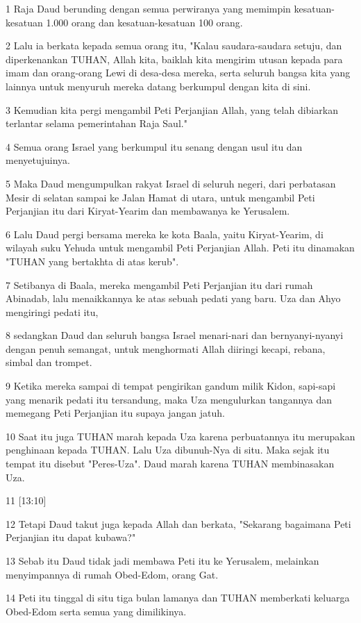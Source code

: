 \par 1 Raja Daud berunding dengan semua perwiranya yang memimpin kesatuan-kesatuan 1.000 orang dan kesatuan-kesatuan 100 orang.
\par 2 Lalu ia berkata kepada semua orang itu, "Kalau saudara-saudara setuju, dan diperkenankan TUHAN, Allah kita, baiklah kita mengirim utusan kepada para imam dan orang-orang Lewi di desa-desa mereka, serta seluruh bangsa kita yang lainnya untuk menyuruh mereka datang berkumpul dengan kita di sini.
\par 3 Kemudian kita pergi mengambil Peti Perjanjian Allah, yang telah dibiarkan terlantar selama pemerintahan Raja Saul."
\par 4 Semua orang Israel yang berkumpul itu senang dengan usul itu dan menyetujuinya.
\par 5 Maka Daud mengumpulkan rakyat Israel di seluruh negeri, dari perbatasan Mesir di selatan sampai ke Jalan Hamat di utara, untuk mengambil Peti Perjanjian itu dari Kiryat-Yearim dan membawanya ke Yerusalem.
\par 6 Lalu Daud pergi bersama mereka ke kota Baala, yaitu Kiryat-Yearim, di wilayah suku Yehuda untuk mengambil Peti Perjanjian Allah. Peti itu dinamakan "TUHAN yang bertakhta di atas kerub".
\par 7 Setibanya di Baala, mereka mengambil Peti Perjanjian itu dari rumah Abinadab, lalu menaikkannya ke atas sebuah pedati yang baru. Uza dan Ahyo mengiringi pedati itu,
\par 8 sedangkan Daud dan seluruh bangsa Israel menari-nari dan bernyanyi-nyanyi dengan penuh semangat, untuk menghormati Allah diiringi kecapi, rebana, simbal dan trompet.
\par 9 Ketika mereka sampai di tempat pengirikan gandum milik Kidon, sapi-sapi yang menarik pedati itu tersandung, maka Uza mengulurkan tangannya dan memegang Peti Perjanjian itu supaya jangan jatuh.
\par 10 Saat itu juga TUHAN marah kepada Uza karena perbuatannya itu merupakan penghinaan kepada TUHAN. Lalu Uza dibunuh-Nya di situ. Maka sejak itu tempat itu disebut "Peres-Uza". Daud marah karena TUHAN membinasakan Uza.
\par 11 [13:10]
\par 12 Tetapi Daud takut juga kepada Allah dan berkata, "Sekarang bagaimana Peti Perjanjian itu dapat kubawa?"
\par 13 Sebab itu Daud tidak jadi membawa Peti itu ke Yerusalem, melainkan menyimpannya di rumah Obed-Edom, orang Gat.
\par 14 Peti itu tinggal di situ tiga bulan lamanya dan TUHAN memberkati keluarga Obed-Edom serta semua yang dimilikinya.


